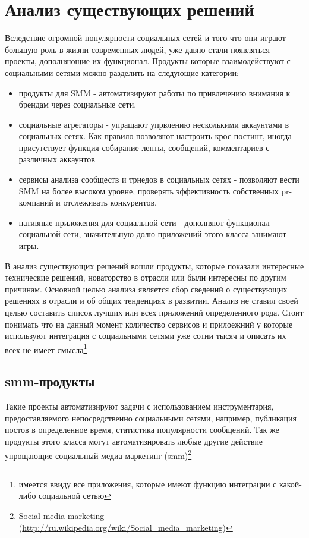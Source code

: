 \section{Анализ существующих решений}
Вследствие огромной популярности социальных сетей и того что они играют большую роль в жизни современных людей, уже давно стали появляться проекты, дополняющие их функционал. Продукты которые взаимодействуют с социальными сетями можно разделить на следующие категории:
\begin{itemize}
\item продукты для SMM - автоматизируют работы по привлечению внимания к брендам через социальные сети.
\item социальные агрегаторы - упращают упрвлению несколькими аккаунтами в социальных сетях. Как правило позволяют настроить крос-постинг, иногда присутствует функция собирание ленты, сообщений, комментариев с различных аккаунтов
\item сервисы анализа сообществ и трнедов в социальных сетях - позволяют вести SMM на более высоком уровне, проверять эффективность собственных pr-компаний и отслеживать конкурентов.
\item нативные приложения для социальной сети - дополняют функционал социальной сети, значительную долю приложений этого класса занимают игры.
\end{itemize} 
В анализ существующих решений вошли продукты, которые показали интересные технические решений, новаторство в отрасли или были интересны по другим причинам. Основной целью анализа  является сбор сведений о существующих решениях в отрасли и об общих тенденциях в развитии.  Анализ не ставил своей целью составить список лучших или всех приложений определенного рода. Стоит понимать что на данный момент количество сервисов и прилоежний у которые используют интеграция с социальными сетями уже сотни тысяч и описать их всех не имеет смысла\footnote{имеется ввиду все приложения, которые имеют функцию интеграции с какой-либо социальной сетью}
\subsection{smm-продукты}
Такие проекты автоматизируют задачи с использованием инструментария, предоставляемого непосредственно социальными сетями, например, публикация постов в определенное время, статистика популярности сообщений. Так же продукты этого класса могут автоматизировать любые другие действие упрощающие социальный медиа маркетинг (smm)\footnote{Social media marketing (\url{http://ru.wikipedia.org/wiki/Social_media_marketing})}
